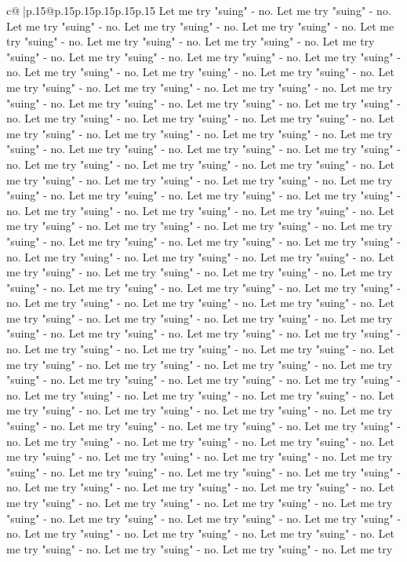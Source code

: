 \documentclass{article}
\begin{document}
{\begin{supertabular}{c@{$\;$}|p{.15\linewidth}@{}p{.15\linewidth}p{.15\linewidth}p{.15\linewidth}p{.15\linewidth}p{.15\linewidth}}
{{{Let me try "suing" {-} no. Let me try "suing" {-} no. Let me try "suing" {-} no. Let me try "suing" {-} no. Let me try "suing" {-} no. Let me try "suing" {-} no. Let me try "suing" {-} no. Let me try "suing" {-} no. Let me try "suing" {-} no. Let me try "suing" {-} no. Let me try "suing" {-} no. Let me try "suing" {-} no. Let me try "suing" {-} no. Let me try "suing" {-} no. Let me try "suing" {-} no. Let me try "suing" {-} no. Let me try "suing" {-} no. Let me try "suing" {-} no. Let me try "suing" {-} no. Let me try "suing" {-} no. Let me try "suing" {-} no. Let me try "suing" {-} no. Let me try "suing" {-} no. Let me try "suing" {-} no. Let me try "suing" {-} no. Let me try "suing" {-} no. Let me try "suing" {-} no. Let me try "suing" {-} no. Let me try "suing" {-} no. Let me try "suing" {-} no. Let me try "suing" {-} no. Let me try "suing" {-} no. Let me try "suing" {-} no. Let me try "suing" {-} no. Let me try "suing" {-} no. Let me try "suing" {-} no. Let me try "suing" {-} no. Let me try "suing" {-} no. Let me try "suing" {-} no. Let me try "suing" {-} no. Let me try "suing" {-} no. Let me try "suing" {-} no. Let me try "suing" {-} no. Let me try "suing" {-} no. Let me try "suing" {-} no. Let me try "suing" {-} no. Let me try "suing" {-} no. Let me try "suing" {-} no. Let me try "suing" {-} no. Let me try "suing" {-} no. Let me try "suing" {-} no. Let me try "suing" {-} no. Let me try "suing" {-} no. Let me try "suing" {-} no. Let me try "suing" {-} no. Let me try "suing" {-} no. Let me try "suing" {-} no. Let me try "suing" {-} no. Let me try "suing" {-} no. Let me try "suing" {-} no. Let me try "suing" {-} no. Let me try "suing" {-} no. Let me try "suing" {-} no. Let me try "suing" {-} no. Let me try "suing" {-} no. Let me try "suing" {-} no. Let me try "suing" {-} no. Let me try "suing" {-} no. Let me try "suing" {-} no. Let me try "suing" {-} no. Let me try "suing" {-} no. Let me try "suing" {-} no. Let me try "suing" {-} no. Let me try "suing" {-} no. Let me try "suing" {-} no. Let me try "suing" {-} no. Let me try "suing" {-} no. Let me try "suing" {-} no. Let me try "suing" {-} no. Let me try "suing" {-} no. Let me try "suing" {-} no. Let me try "suing" {-} no. Let me try "suing" {-} no. Let me try "suing" {-} no. Let me try "suing" {-} no. Let me try "suing" {-} no. Let me try "suing" {-} no. Let me try "suing" {-} no. Let me try "suing" {-} no. Let me try "suing" {-} no. Let me try "suing" {-} no. Let me try "suing" {-} no. Let me try "suing" {-} no. Let me try "suing" {-} no. Let me try "suing" {-} no. Let me try "suing" {-} no. Let me try "suing" {-} no. Let me try "suing" {-} no. Let me try "suing" {-} no. Let me try "suing" {-} no. Let me try "suing" {-} no. Let me try "suing" {-} no. Let me try "suing" {-} no. Let me try "suing" {-} no. Let me try "suing" {-} no. Let me try "suing" {-} no. Let me try "suing" {-} no. Let me try "suing" {-} no. Let me try "suing" {-} no. Let me try "suing" {-} no. Let me try "suing" {-} no. Let me try "suing" {-} no. Let me try "suing" {-} no. Let me try "suing" {-} no. Let me try "suing" {-} no. Let me try "suing" {-} no. Let me try "suing" {-} no. Let me try "suing" {-} no. Let me try }}}
\end{supertabular}}
\end{document}
